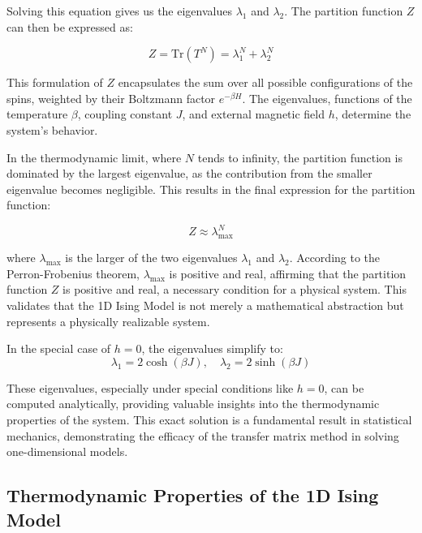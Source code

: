 Solving this equation gives us the eigenvalues \( \lambda_1 \) and \( \lambda_2
\). The partition function \( Z \) can then be expressed as:

\begin{equation}
Z = \text{Tr}(T^N) = \lambda_1^N + \lambda_2^N
\end{equation}

This formulation of \( Z \) encapsulates the sum over all possible
configurations of the spins, weighted by their Boltzmann factor \( e^{-\beta H}
\). The eigenvalues, functions of the temperature \( \beta \), coupling constant
\( J \), and external magnetic field \( h \), determine the system's behavior.

In the thermodynamic limit, where \( N \) tends to infinity, the partition
function is dominated by the largest eigenvalue, as the contribution from the
smaller eigenvalue becomes negligible. This results in the final expression for
the partition function:

\begin{equation}
Z \approx \lambda_{\text{max}}^N
\label{eq:partitionmax}
\end{equation}

where \( \lambda_{\text{max}} \) is the larger of the two eigenvalues \(
\lambda_1 \) and \( \lambda_2 \). According to the Perron-Frobenius theorem, \(
\lambda_{\text{max}} \) is positive and real, affirming that the partition
function \( Z \) is positive and real, a necessary condition for a physical
system. This validates that the 1D Ising Model is not merely a mathematical
abstraction but represents a physically realizable system.

In the special case of \( h = 0 \), the eigenvalues simplify to:
\begin{equation}
 \lambda_1 = 2 \cosh(\beta J), \quad \lambda_2 = 2 \sinh(\beta J)
\end{equation}

These eigenvalues, especially under special conditions like \( h = 0 \), can be
computed analytically, providing valuable insights into the thermodynamic
properties of the system. This exact solution is a fundamental result in
statistical mechanics, demonstrating the efficacy of the transfer matrix method
in solving one-dimensional models.

\subsection{Thermodynamic Properties of the 1D Ising Model}

